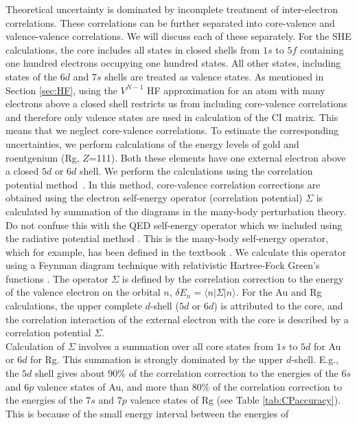 \documentclass[10pt,a4paper, twoside, openright]{report}
\begin{document}
Theoretical uncertainty is dominated by incomplete treatment of inter-electron correlations. These correlations can be further separated into core-valence and valence-valence correlations. We will discuss each of these separately. For the SHE calculations, the core includes all states in closed shells
from $1s$ to $5f$ containing one hundred electrons occupying one hundred states.
All other states, including states of the $6d$ and $7s$ shells are treated as
valence states. As mentioned in Section \ref{sec:HF}, using the $V^{N-1}$ HF approximation for an atom with many electrons above a closed shell restricts us from including core-valence correlations and therefore only valence states are used in calculation of the CI matrix.
This means that we neglect core-valence correlations. To estimate the corresponding uncertainties, we perform calculations of the energy levels of gold and roentgenium (Rg, $Z$=111). Both these elements have one external electron above a closed $5d$ or $6d$ shell. We perform the calculations using the correlation potential method~\cite{Dzuba1988, DFSS1987_2}. In this method, core-valence correlation corrections are obtained using the electron self-energy operator (correlation potential) $\Sigma$ is calculated by summation of the diagrams in the many-body perturbation theory. Do not confuse this with  the QED self-energy operator which we included using the radiative potential method \cite{FG2005}. This is the many-body self-energy operator, which for example, has been defined in the textbook \cite{LandauStatPhysPart2}. We calculate this operator using a Feynman diagram technique with relativistic Hartree-Fock Green's functions \cite{Dzuba1988}. The operator $\Sigma $ is defined by the correlation correction to the energy of the valence electron on the orbital $n$, $\delta E_n = \langle n | \Sigma | n \rangle$.   For the Au and Rg calculations, the upper complete $d$-shell ($5d$ or $6d$) is attributed to the core, and the correlation interaction of the external electron with the core is described by a correlation potential $\Sigma$.   \\
\linebreak
Calculation of $\Sigma$ involves a summation over all core states from
$1s$ to $5d$ for Au or $6d$ for Rg. This summation is strongly dominated by the upper $d$-shell. E.g., the $5d$ shell gives about 90\% of the correlation correction to the energies of the $6s$ and $6p$ valence states of Au, and more than 80\% of the correlation correction to the energies of the $7s$ and $7p$ valence states of Rg (see Table \ref{tab:CPaccuracy}). This is because of the small energy interval between the energies of
\end{document}
